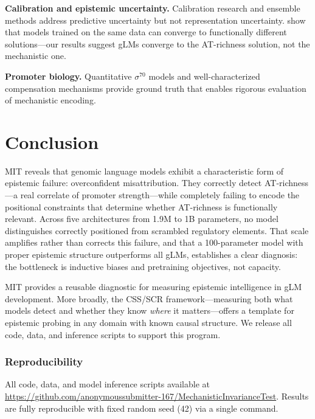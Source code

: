\documentclass{article}
\begin{document}
\textbf{Calibration and epistemic uncertainty.}
Calibration research \citep{guo2017calibration} and ensemble methods
\citep{lakshminarayanan2017simple} address predictive uncertainty but
not representation uncertainty.
\citet{d2020underspecification} show that models trained on the same
data can converge to functionally different solutions---our results
suggest gLMs converge to the AT-richness solution, not the mechanistic
one.

\textbf{Promoter biology.}
Quantitative $\sigma^{70}$ models \citep{brewster2012lac,kinney2010using}
and well-characterized compensation mechanisms
\citep{ross1993third,barne1997region} provide ground truth that enables
rigorous evaluation of mechanistic encoding.

\section{Conclusion}

MIT reveals that genomic language models exhibit a characteristic form
of epistemic failure: overconfident misattribution.
They correctly detect AT-richness---a real correlate of promoter
strength---while completely failing to encode the positional constraints
that determine whether AT-richness is functionally relevant.
Across five architectures from 1.9M to 1B parameters, no model
distinguishes correctly positioned from scrambled regulatory elements.
That scale amplifies rather than corrects this failure, and that a
100-parameter model with proper epistemic structure outperforms all
gLMs, establishes a clear diagnosis: the bottleneck is inductive biases
and pretraining objectives, not capacity.

MIT provides a reusable diagnostic for measuring epistemic intelligence
in gLM development.
More broadly, the CSS/SCR framework---measuring both what models detect
and whether they know \emph{where} it matters---offers a template for
epistemic probing in any domain with known causal structure.
We release all code, data, and inference scripts to support this
program.

\subsubsection*{Reproducibility}
All code, data, and model inference scripts available at
\url{https://github.com/anonymoussubmitter-167/MechanisticInvarianceTest}.
Results are fully reproducible with fixed random seed (42) via a single
command.
\end{document}
